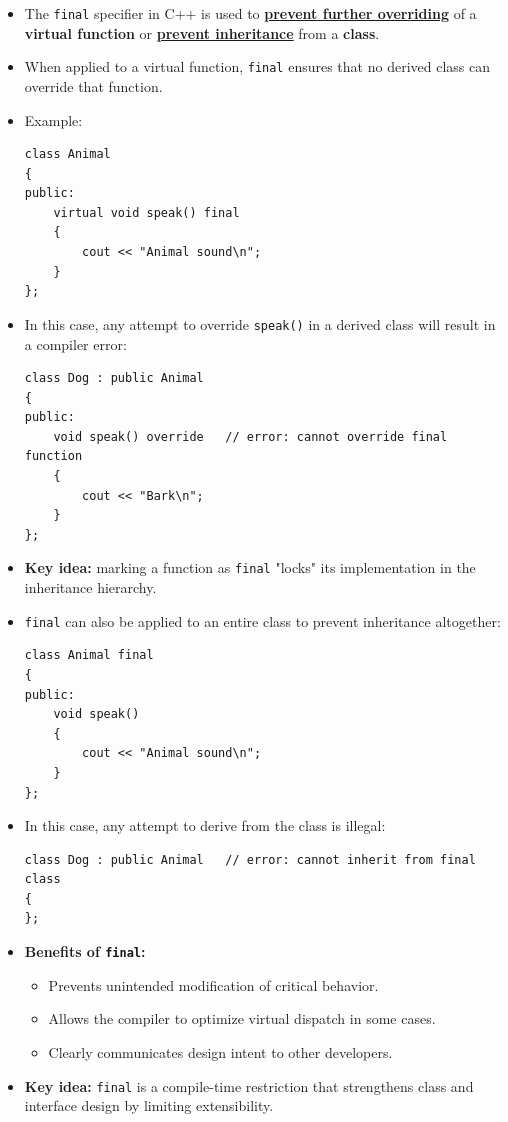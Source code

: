 \documentclass[10pt]{article}
\begin{document}
\begin{itemize}
\item The \texttt{final} specifier in C++ is used to \underline{\textbf{prevent further overriding}} of a \textbf{virtual function} or \underline{\textbf{prevent inheritance}} from a \textbf{class}.

	\item When applied to a virtual function, \texttt{final} ensures that no derived class can override that function.

	\item Example:

\begin{verbatim}
class Animal
{
public:
    virtual void speak() final
    {
        cout << "Animal sound\n";
    }
};
\end{verbatim}

	\item In this case, any attempt to override \texttt{speak()} in a derived class will result in a compiler error:

\begin{verbatim}
class Dog : public Animal
{
public:
    void speak() override   // error: cannot override final function
    {
        cout << "Bark\n";
    }
};
\end{verbatim}

	\item \textbf{Key idea:} marking a function as \texttt{final} "locks" its implementation in the inheritance hierarchy.

	\item \texttt{final} can also be applied to an entire class to prevent inheritance altogether:

\begin{verbatim}
class Animal final
{
public:
    void speak()
    {
        cout << "Animal sound\n";
    }
};
\end{verbatim}

	\item In this case, any attempt to derive from the class is illegal:

\begin{verbatim}
class Dog : public Animal   // error: cannot inherit from final class
{
};
\end{verbatim}

	\item \textbf{Benefits of \texttt{final}:}
	\begin{itemize}
		\item Prevents unintended modification of critical behavior.
		\item Allows the compiler to optimize virtual dispatch in some cases.
		\item Clearly communicates design intent to other developers.
	\end{itemize}

	\item \textbf{Key idea:} \texttt{final} is a compile-time restriction that strengthens class and interface design by limiting extensibility.
\end{itemize}
\end{document}
